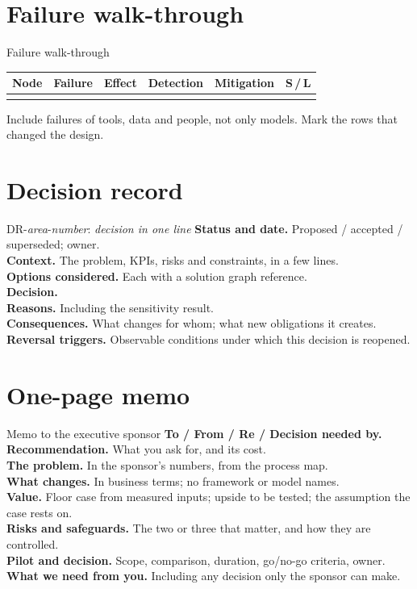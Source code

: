 \section{Failure walk-through}

\begin{template}{Failure walk-through}
\begin{tabular}{@{}llllll@{}}
Node & Failure & Effect & Detection & Mitigation & S\,/\,L \\
\hline
 & & & & & \\
\end{tabular}

\smallskip
Include failures of tools, data and people, not only models. Mark the rows that changed the design.
\end{template}

\section{Decision record}

\begin{template}{DR-\emph{area}-\emph{number}: \emph{decision in one line}}
\textbf{Status and date.} Proposed / accepted / superseded; owner.\\
\textbf{Context.} The problem, KPIs, risks and constraints, in a few lines.\\
\textbf{Options considered.} Each with a solution graph reference.\\
\textbf{Decision.}\\
\textbf{Reasons.} Including the sensitivity result.\\
\textbf{Consequences.} What changes for whom; what new obligations it creates.\\
\textbf{Reversal triggers.} Observable conditions under which this decision is reopened.
\end{template}

\section{One-page memo}

\begin{template}{Memo to the executive sponsor}
\textbf{To / From / Re / Decision needed by.}\\
\textbf{Recommendation.} What you ask for, and its cost.\\
\textbf{The problem.} In the sponsor's numbers, from the process map.\\
\textbf{What changes.} In business terms; no framework or model names.\\
\textbf{Value.} Floor case from measured inputs; upside to be tested; the assumption the case rests on.\\
\textbf{Risks and safeguards.} The two or three that matter, and how they are controlled.\\
\textbf{Pilot and decision.} Scope, comparison, duration, go/no-go criteria, owner.\\
\textbf{What we need from you.} Including any decision only the sponsor can make.
\end{template}


